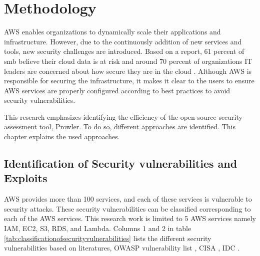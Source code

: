 
\chapter{Methodology}

\par AWS enables organizations to dynamically scale their applications and infrastructure.
However, due to the continuously addition of new services
and tools, new security challenges are
introduced.
Based on a report, 61 percent of \gls{smb} believe their
cloud
data is at risk and around 70 percent of organizations IT
leaders are concerned about how secure they are in the
cloud \cite{73}.
Although AWS is responsible for securing the infrastructure, it makes it clear to the users to ensure AWS services are properly configured according to best practices to avoid security vulnerabilities.

\par This research emphasizes identifying the efficiency of the open-source security assessment tool, Prowler.
To do so, different approaches are identified. This chapter explains the used approaches.


\section{Identification of Security vulnerabilities and Exploits}

\par AWS provides more than 100 services, and each of these services is vulnerable to security attacks.
These security vulnerabilities can be classified corresponding to each of the AWS services.
This research work is limited to 5 AWS services namely IAM, EC2, S3, RDS, and Lambda.
Columns 1 and 2 in table \ref{tab:classificationofsecurityvulnerabilities} lists the different security
vulnerabilities based on literatures, OWASP vulnerability
list \cite{51}, CISA \cite{52}, IDC \cite{53}.

